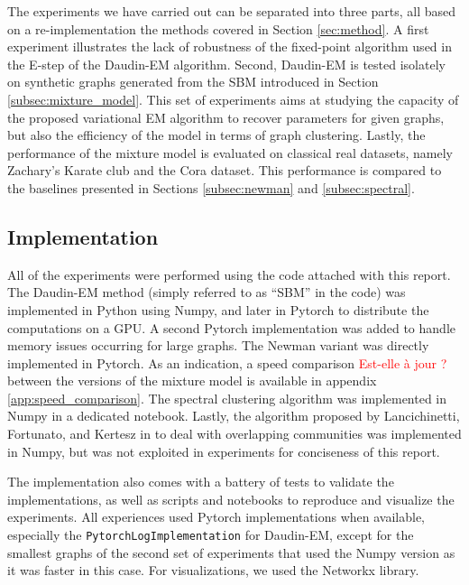 \documentclass[switch, 12pt]{article}
\begin{document}
\begin{multicols}{2}
    The experiments we have carried out can be separated into three parts, all based on a re-implementation the methods covered in Section \ref{sec:method}. A first experiment illustrates the lack of robustness of the fixed-point algorithm used in the E-step of the Daudin-EM algorithm.
    Second, Daudin-EM is tested isolately on synthetic graphs generated from the SBM introduced in Section \ref{subsec:mixture_model}. This set of experiments aims at studying the capacity of the proposed variational EM algorithm to recover parameters for given graphs, but also the efficiency of the model in terms of graph clustering.
    Lastly, the performance of the mixture model is evaluated on classical real datasets, namely Zachary's Karate club and the Cora dataset. This performance is compared to the baselines presented in Sections \ref{subsec:newman} and \ref{subsec:spectral}.

    \subsection{Implementation}

    All of the experiments were performed using the code attached with this report. The Daudin-EM method (simply referred to as ``SBM'' in the code) was implemented in Python using Numpy, and later in Pytorch to distribute the computations on a GPU. A second Pytorch implementation was added to handle memory issues occurring for large graphs. The Newman variant was directly implemented in Pytorch. As an indication, a speed comparison \textcolor{red}{Est-elle à jour ?} between the versions of the mixture model is available in appendix \ref{app:speed_comparison}. The spectral clustering algorithm was implemented in Numpy in a dedicated notebook. Lastly, the algorithm proposed by Lancichinetti, Fortunato, and Kertesz in \cite{lancichinetti_detecting_2009} to deal with overlapping communities was implemented in Numpy, but was not exploited in experiments for conciseness of this report. %

    The implementation also comes with a battery of tests to validate the implementations, as well as scripts and notebooks to reproduce and visualize the experiments. All experiences used Pytorch implementations when available, especially the \texttt{PytorchLogImplementation} for Daudin-EM, except for the smallest graphs of the second set of experiments that used the Numpy version as it was faster in this case. For visualizations, we used the Networkx library.


\end{multicols}
\end{document}

